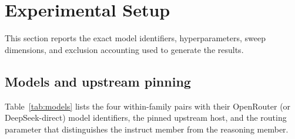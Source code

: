 \section{Experimental Setup}
\label{sec:setup}

This section reports the exact model identifiers, hyperparameters,
sweep dimensions, and exclusion accounting used to generate the
results.

\subsection{Models and upstream pinning}

Table~\ref{tab:models} lists the four within-family pairs with their
OpenRouter (or DeepSeek-direct) model identifiers, the pinned upstream
host, and the routing parameter that distinguishes the instruct member
from the reasoning member.

